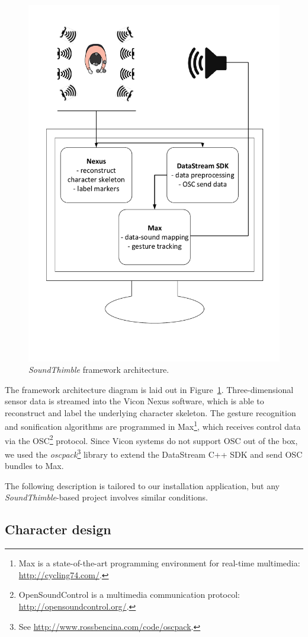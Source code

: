 \begin{figure}[t]
	\centering
	\includegraphics[width=.65\columnwidth, clip, trim={0 3cm 0 0}]{img/archi}
	\caption{\textit{SoundThimble} framework architecture.}
	\label{fig:archi}
\end{figure}

The framework architecture diagram is laid out in Figure~\ref{fig:archi}. Three-dimensional sensor data is streamed into the Vicon Nexus software, which is able to reconstruct and label the underlying character skeleton. The gesture recognition and sonification algorithms are programmed in Max\footnote{Max is a state-of-the-art programming environment for real-time multimedia: \url{http://cycling74.com/}.}, which receives control data via the OSC\footnote{OpenSoundControl is a multimedia communication protocol: \url{http://opensoundcontrol.org/}.} protocol. Since Vicon systems do not support OSC out of the box, we used the \textit{oscpack}\footnote{See \url{http://www.rossbencina.com/code/oscpack}.} library to extend the DataStream C++ SDK and send OSC bundles to Max.

The following description is tailored to our installation application, but any \textit{SoundThimble}-based project involves similar conditions.

\subsection{Character design}

